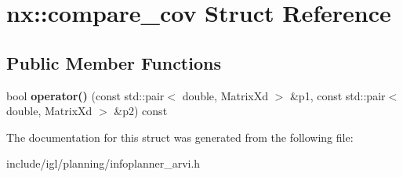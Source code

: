 \hypertarget{structnx_1_1compare__cov}{}\section{nx\+:\+:compare\+\_\+cov Struct Reference}
\label{structnx_1_1compare__cov}
\subsection*{Public Member Functions}
\begin{DoxyCompactItemize}
\item 
\mbox{\label{structnx_1_1compare__cov_ae631418a3c019ed7e215a777c855337c}} 
bool {\bfseries operator()} (const std\+::pair$<$ double, Matrix\+Xd $>$ \&p1, const std\+::pair$<$ double, Matrix\+Xd $>$ \&p2) const
\end{DoxyCompactItemize}


The documentation for this struct was generated from the following file\+:\begin{DoxyCompactItemize}
\item 
include/igl/planning/infoplanner\+\_\+arvi.\+h\end{DoxyCompactItemize}
